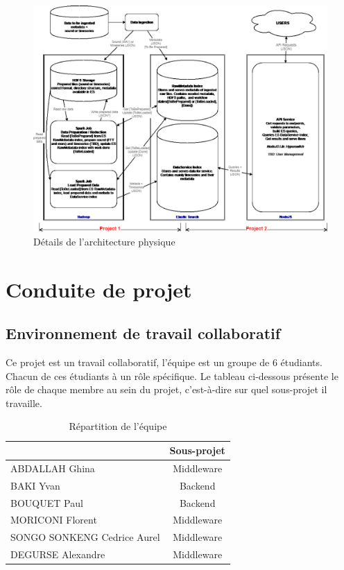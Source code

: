 \documentclass[a4paper]{article}
\begin{document}
\begin{figure}[h]
	\centering
	\includegraphics[width=\textwidth]{./tmp/ArchiPhy.png}
	\caption{Détails de l'architecture physique}
\end{figure}

\section{Conduite de projet}

\subsection{Environnement de travail collaboratif}

Ce projet est un travail collaboratif, l’équipe est un groupe de 6 étudiants. Chacun de ces étudiants
à un rôle spécifique. Le tableau ci-dessous présente le rôle de chaque membre au sein du projet,
c’est-à-dire sur quel sous-projet il travaille.

	\begin{table}[!h]

\begin{center}
	\begin{tabular}{|l|c|}

\hline
        \rowcolor{headb} \multicolumn{1}{|c|}{{\color{white}\'Etudiant}}  & {\color{white}Sous-projet}\\
\hline
        \rowcolor{lineb}
        ABDALLAH Ghina          & Middleware\\
        BAKI Yvan               & Backend\\
        \rowcolor{lineb}
        BOUQUET Paul            & Backend\\
        MORICONI Florent        & Middleware\\
        \rowcolor{lineb}
        SONGO SONKENG Cedrice Aurel & Middleware\\
        DEGURSE Alexandre       & Middleware\\
        \hline
\end{tabular}

	\caption{Répartition de l'équipe}

\end{center}
\end{table}
\end{document}
